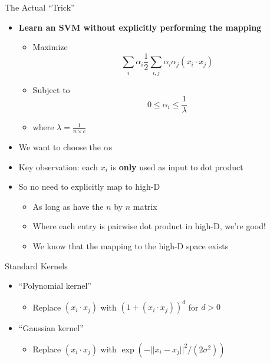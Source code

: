 \documentclass[aspectratio=169]{beamer}
\begin{document}
\begin{frame}{The Actual ``Trick''}

\begin{itemize}
\item \textbf{Learn an SVM without explicitly performing the mapping}
\begin{itemize}
	\item Maximize $$\sum_i \alpha_i \frac{1}{2} \sum_{i,j} \alpha_i \alpha_j (x_i \cdot x_j)$$
	\item Subject to $$0 \leq \alpha_i \leq \frac{1}{\lambda}$$
	\item where $\lambda = \frac{1}{n \times c}$

\end{itemize}
\item We want to choose the $\alpha$s
\item Key observation: each $x_i$ is \textbf{only} used as input to dot product
\item So no need to explicitly map to high-D
	\begin{itemize}
	\item As long as have the $n$ by $n$ matrix
	\item Where each entry is pairwise dot product in high-D, we're good!
	\item We know that the mapping to the high-D space exists %
	\end{itemize}
\end{itemize}
\end{frame}
\begin{frame}{Standard Kernels}

\begin{itemize}
\item ``Polynomial kernel''
	\begin{itemize}
	\item Replace $(x_i \cdot x_j)$ with $(1 + (x_i \cdot x_j))^d$ for $d > 0$
	\end{itemize}
\item ``Gaussian kernel''
	\begin{itemize}
	\item Replace $(x_i \cdot x_j)$ with $\exp (-|| x_i - x_j ||^2 / (2 \sigma^2))$
	\end{itemize}
\end{itemize}
\end{frame}
\end{document}
